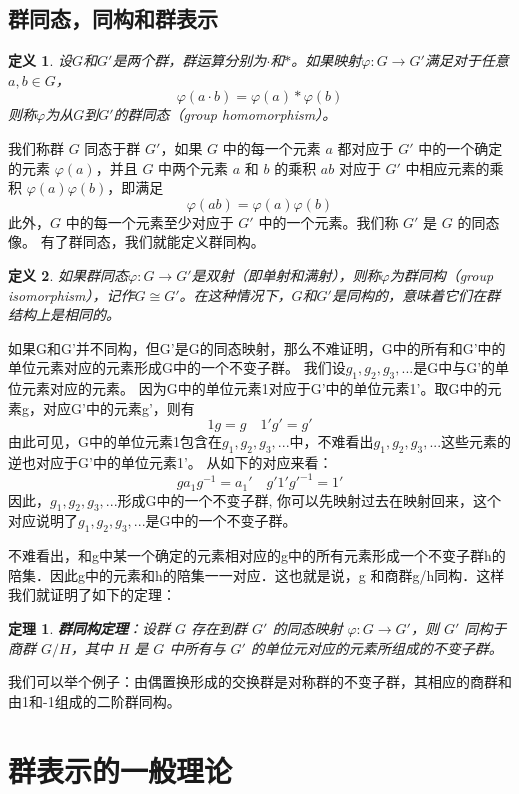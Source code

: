\documentclass{ctexart}%
\newtheorem{definition}{定义}
\newtheorem{theorem}{定理}
\begin{document}
\subsection{群同态，同构和群表示}
\begin{definition}
    设$G$和$G'$是两个群，群运算分别为$\cdot$和$*$。如果映射$\varphi: G \to G'$满足对于任意$a, b \in G$，
    \[
        \varphi(a \cdot b) = \varphi(a) * \varphi(b)
    \]
    则称$\varphi$为从$G$到$G'$的群同态（group homomorphism）。
\end{definition}
我们称群 $G$ 同态于群 $G'$，如果 $G$ 中的每一个元素 $a$ 都对应于 $G'$ 中的一个确定的元素 $\varphi(a)$，并且 $G$ 中两个元素 $a$ 和 $b$ 的乘积 $ab$ 对应于 $G'$ 中相应元素的乘积 $\varphi(a)\varphi(b)$，即满足
\[
    \varphi(ab) = \varphi(a)\varphi(b)
\]
此外，$G$ 中的每一个元素至少对应于 $G'$ 中的一个元素。我们称 $G'$ 是 $G$ 的同态像。
有了群同态，我们就能定义群同构。
\begin{definition}
    如果群同态$\varphi: G \to G'$是双射（即单射和满射），则称$\varphi$为群同构（group isomorphism），记作$G \cong G'$。在这种情况下，$G$和$G'$是同构的，意味着它们在群结构上是相同的。
\end{definition}
如果G和G'并不同构，但G'是G的同态映射，那么不难证明，G中的所有和G'中的单位元素对应的元素形成G中的一个不变子群。
我们设$g_1,g_2,g_3,...$是G中与G'的单位元素对应的元素。
因为G中的单位元素1对应于G'中的单位元素1’。取G中的元素g，对应G'中的元素g’，则有
\[  1 g = g \quad 1'g' = g' \]
由此可见，G中的单位元素1包含在$g_1,g_2,g_3,...$中，不难看出$g_1,g_2,g_3,...$这些元素的逆也对应于G'中的单位元素1’。
从如下的对应来看：
\[
g a_1 g^{-1} = a_1' \quad g' 1' g'^{-1} = 1'
\]
因此，$g_1,g_2,g_3,...$形成G中的一个不变子群, 你可以先映射过去在映射回来，这个对应说明了$g_1,g_2,g_3,...$是G中的一个不变子群。

不难看出，和g中某一个确定的元素相对应的g中的所有元素形成一个不变子群h的陪集．因此g中的元素和h的陪集一一对应．这也就是说，g 和商群g/h同构．这样我们就证明了如下的定理：

\begin{theorem}
    \textbf{群同构定理}：设群 $G$ 存在到群 $G'$ 的同态映射 $\varphi: G \to G'$，则 $G'$ 同构于商群 $G/H$，其中 $H$ 是 $G$ 中所有与 $G'$ 的单位元对应的元素所组成的不变子群。
\end{theorem}
我们可以举个例子：由偶置换形成的交换群是对称群的不变子群，其相应的商群和由1和-1组成的二阶群同构。

\section{群表示的一般理论}
\end{document}
